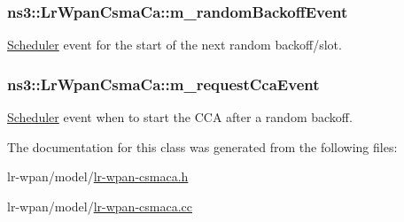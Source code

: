 \subsubsection[{\texorpdfstring{m\+\_\+random\+Backoff\+Event}{m_randomBackoffEvent}}]{ ns3\+::\+Lr\+Wpan\+Csma\+Ca\+::m\+\_\+random\+Backoff\+Event\hspace{0.3cm}{\ttfamily [private]}}\hypertarget{classns3_1_1LrWpanCsmaCa_a426a65b1bf9433af0e88d7dd4b4b8e10}{}\label{classns3_1_1LrWpanCsmaCa_a426a65b1bf9433af0e88d7dd4b4b8e10}
\hyperlink{classns3_1_1Scheduler}{Scheduler} event for the start of the next random backoff/slot. 
\subsubsection[{\texorpdfstring{m\+\_\+request\+Cca\+Event}{m_requestCcaEvent}}]{ ns3\+::\+Lr\+Wpan\+Csma\+Ca\+::m\+\_\+request\+Cca\+Event\hspace{0.3cm}{\ttfamily [private]}}\hypertarget{classns3_1_1LrWpanCsmaCa_a6a215728f302ffbcfe97f8d560f37780}{}\label{classns3_1_1LrWpanCsmaCa_a6a215728f302ffbcfe97f8d560f37780}
\hyperlink{classns3_1_1Scheduler}{Scheduler} event when to start the C\+CA after a random backoff. 

The documentation for this class was generated from the following files\+:\begin{DoxyCompactItemize}
\item 
lr-\/wpan/model/\hyperlink{lr-wpan-csmaca_8h}{lr-\/wpan-\/csmaca.\+h}\item 
lr-\/wpan/model/\hyperlink{lr-wpan-csmaca_8cc}{lr-\/wpan-\/csmaca.\+cc}\end{DoxyCompactItemize}
